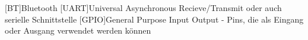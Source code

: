 
\begin{acronym}[ACRONYM]
[BT]{Bluetooth}
[UART]{Universal Asynchronous Recieve/Transmit oder auch serielle Schnittstelle}
[GPIO]{General Purpose Input Output - Pins, die als Eingang oder Ausgang verwendet werden können}
\end{acronym}\newpage

